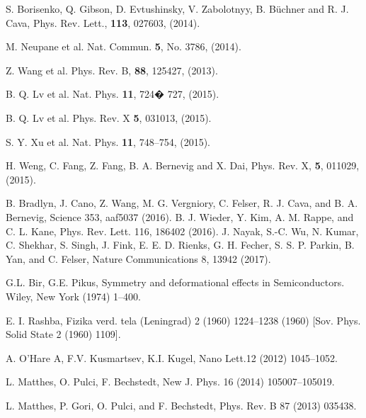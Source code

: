 \documentclass[prb,twocolumn,aps,superscriptaddress,showpacs,floatfix]{revtex4}
\begin{document}
\begin{thebibliography}{10}
S. Borisenko, Q. Gibson, D. Evtushinsky, V. Zabolotnyy, B. B{\"u}chner and R. J. Cava,
Phys. Rev. Lett., {\bf 113}, 027603, (2014).

M. Neupane et al.
Nat. Commun. {\bf 5}, No. 3786, (2014).

Z. Wang et al.
Phys. Rev. B, {\bf 88}, 125427, (2013).


B. Q. Lv et al.
Nat. Phys. {\bf 11}, 724� 727, (2015).

B. Q. Lv et al.
Phys. Rev. X {\bf 5}, 031013, (2015).

S. Y. Xu et al.
Nat. Phys. {\bf 11}, 748–754, (2015).


H. Weng, C. Fang, Z. Fang, B. A. Bernevig and X. Dai,
Phys. Rev. X, {\bf 5}, 011029, (2015).

 B. Bradlyn, J. Cano, Z. Wang, M. G. Vergniory, C. Felser, R. J.
Cava, and B. A. Bernevig, Science 353, aaf5037 (2016).
B. J. Wieder, Y. Kim, A. M. Rappe, and C. L. Kane, Phys. Rev.
Lett. 116, 186402 (2016).
J. Nayak, S.-C. Wu, N. Kumar, C. Shekhar, S. Singh, J. Fink,
E. E. D. Rienks, G. H. Fecher, S. S. P. Parkin, B. Yan, and
C. Felser, Nature Communications 8, 13942 (2017).


 G.L. Bir, G.E. Pikus, Symmetry and deformational effects in Semiconductors. Wiley, New
York (1974) 1--400.

 E. I. Rashba, Fizika verd. tela (Leningrad) 2 (1960) 1224--1238 (1960) [Sov. Phys. Solid State 2 (1960) 1109].


 A. O'Hare A, F.V. Kusmartsev,  K.I. Kugel, Nano Lett.12 (2012) 1045--1052.


 L. Matthes, O. Pulci, F. Bechstedt, New J. Phys. 16 (2014) 105007--105019.

 L. Matthes, P. Gori, O. Pulci, and F. Bechstedt, Phys. Rev. B 87 (2013) 035438.


\end{thebibliography}
\end{document}
